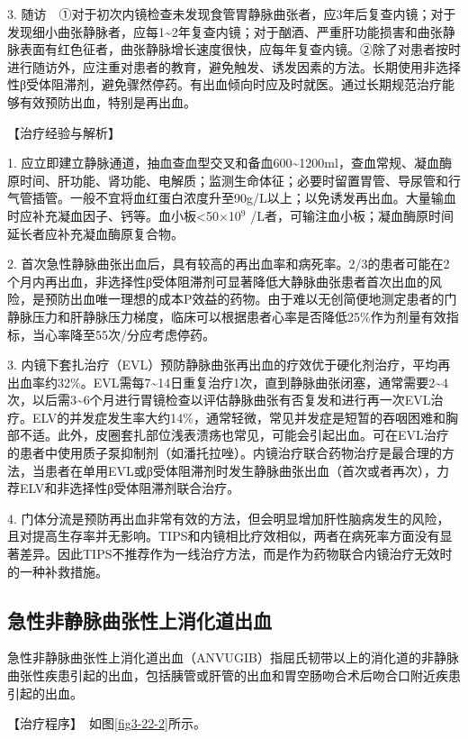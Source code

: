 3.
随访　①对于初次内镜检查未发现食管胃静脉曲张者，应3年后复查内镜；对于发现细小曲张静脉者，应每1\textasciitilde{}2年复查内镜；对于酗酒、严重肝功能损害和曲张静脉表面有红色征者，曲张静脉增长速度很快，应每年复查内镜。②除了对患者按时进行随访外，应注重对患者的教育，避免触发、诱发因素的方法。长期使用非选择性β受体阻滞剂，避免骤然停药。有出血倾向时应及时就医。通过长期规范治疗能够有效预防出血，特别是再出血。

【治疗经验与解析】

1.
应立即建立静脉通道，抽血查血型交叉和备血600\textasciitilde{}1200ml，查血常规、凝血酶原时间、肝功能、肾功能、电解质；监测生命体征；必要时留置胃管、导尿管和行气管插管。一般不宜将血红蛋白浓度升至90g/L以上；以免诱发再出血。大量输血时应补充凝血因子、钙等。血小板\textless{}50×10$^{9}$
/L者，可输注血小板；凝血酶原时间延长者应补充凝血酶原复合物。

2.
首次急性静脉曲张出血后，具有较高的再出血率和病死率。2/3的患者可能在2个月内再出血，非选择性β受体阻滞剂可显著降低大静脉曲张患者首次出血的风险，是预防出血唯一理想的成本P效益的药物。由于难以无创简便地测定患者的门静脉压力和肝静脉压力梯度，临床可以根据患者心率是否降低25\%作为剂量有效指标，当心率降至55次/分应考虑停药。

3.
内镜下套扎治疗（EVL）预防静脉曲张再出血的疗效优于硬化剂治疗，平均再出血率约32\%。EVL需每7\textasciitilde{}14日重复治疗1次，直到静脉曲张闭塞，通常需要2\textasciitilde{}4次，以后需3\textasciitilde{}6个月进行胃镜检查以评估静脉曲张有否复发和进行再一次EVL治疗。ELV的并发症发生率大约14\%，通常轻微，常见并发症是短暂的吞咽困难和胸部不适。此外，皮圈套扎部位浅表溃疡也常见，可能会引起出血。可在EVL治疗的患者中使用质子泵抑制剂（如潘托拉唑）。内镜治疗联合药物治疗是最合理的方法，当患者在单用EVL或β受体阻滞剂时发生静脉曲张出血（首次或者再次），力荐ELV和非选择性β受体阻滞剂联合治疗。

4.
门体分流是预防再出血非常有效的方法，但会明显增加肝性脑病发生的风险，且对提高生存率并无影响。TIPS和内镜相比疗效相似，两者在病死率方面没有显著差异。因此TIPS不推荐作为一线治疗方法，而是作为药物联合内镜治疗无效时的一种补救措施。

\subsection{急性非静脉曲张性上消化道出血}

急性非静脉曲张性上消化道出血（ANVUGIB）指屈氏韧带以上的消化道的非静脉曲张性疾患引起的出血，包括胰管或肝管的出血和胃空肠吻合术后吻合口附近疾患引起的出血。

【治疗程序】　如图\ref{fig3-22-2}所示。


